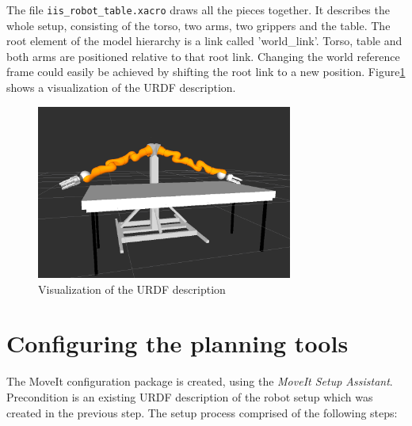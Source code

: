 The file \texttt{iis\_robot\_table.xacro} draws all the pieces together. It describes the whole setup, consisting of the torso, two arms, two grippers and the table. The root element of the model hierarchy is a link called 'world\_link'. Torso, table and both arms are positioned relative to that root link. Changing the world reference frame could easily be achieved by shifting the root link to a new position. Figure\ref{fig:robot_table} shows a visualization of the URDF description.
\begin{figure}
	\centering
  	\includegraphics[width=0.75\textwidth]{images/iis_robot_table.png}
	\caption{Visualization of the URDF description}
	\label{fig:robot_table}
\end{figure}

\section{Configuring the planning tools}
\label{sec:moveit_assistant}

The MoveIt configuration package is created, using the \emph{MoveIt Setup Assistant}. Precondition is an existing URDF description of the robot setup which was created in the previous step.
The setup process comprised of the following steps:


